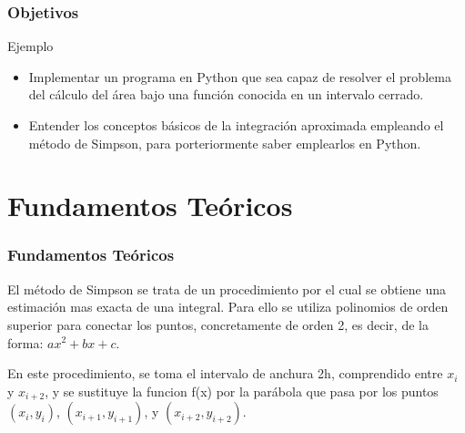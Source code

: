 \documentclass{beamer}
\begin{document}
\begin{frame}

\frametitle{Objetivos }

\begin{block}{Ejemplo}
  \begin{itemize}
  \item
   Implementar un programa en Python que sea capaz de resolver el problema del cálculo del área bajo una función conocida en un 
   intervalo cerrado.
  \pause
  \item
   Entender los conceptos básicos de la integración aproximada empleando el método de Simpson, para porteriormente saber emplearlos
   en Python.

  \end{itemize}
\end{block}

\end{frame}

\section{Fundamentos Teóricos}

\begin{frame}
\frametitle{Fundamentos Teóricos}
	El método de Simpson se trata de un procedimiento por el cual se obtiene una estimación mas exacta de una integral. Para ello se 
utiliza polinomios de orden superior para conectar los puntos, concretamente de orden 2, es decir, de la forma: $ ax^2 + bx + c $.

	En este procedimiento, se toma el intervalo de anchura 2h, comprendido entre $x_{i}$ y $ x_{i+2} $, y se sustituye la funcion f(x) por la parábola que pasa por los puntos $ (x_{i},y_{i}) $, $ (x_{i+1},y_{i+1}) $, y $ (x_{i+2},y_{i+2}) $.

\end{frame}
\end{document}
